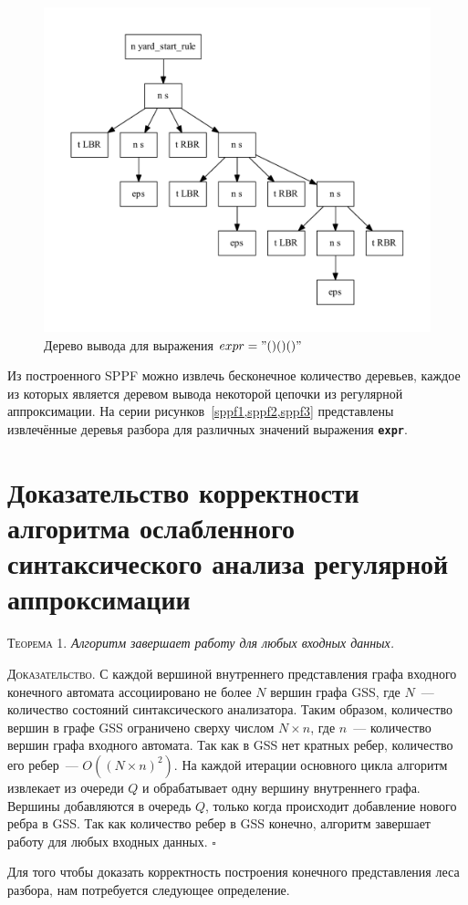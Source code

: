 \begin{figure}[!h]
 \centering
 \includegraphics[width=.7\textwidth]{pics/sppf3.pdf}
 \caption{Дерево вывода для выражения $expr="()()()"$}
 \label{sppf3}
\end{figure}

Из построенного SPPF можно извлечь бесконечное количество деревьев, каждое из которых является деревом вывода некоторой цепочки из регулярной аппроксимации. На серии рисунков~\ref{sppf1,sppf2,sppf3} представлены извлечённые деревья разбора для различных значений выражения \textbf{\texttt{expr}}.  


\chapter{Доказательство корректности алгоритма ослабленного синтаксического анализа регулярной аппроксимации}

\textsc{Теорема 1.} 
\textit{Алгоритм завершает работу для любых входных данных.}

\textsc{Доказательство.}
С каждой вершиной внутреннего представления графа входного конечного автомата ассоциировано не более $N$ вершин графа GSS, где $N$~--- количество состояний синтаксического анализатора. Таким образом, количество вершин в графе GSS ограничено сверху числом $N \times n$, где $n$~--- количество вершин графа входного автомата. Так как в GSS нет кратных ребер, количество его ребер~--- $O((N \times n)^{2})$. На каждой итерации основного цикла алгоритм извлекает из очереди $Q$ и обрабатывает одну вершину внутреннего графа. Вершины добавляются в очередь $Q$, только когда происходит добавление нового ребра в GSS. Так как количество ребер в GSS конечно, алгоритм завершает работу для любых входных данных. $\square$

Для того чтобы доказать корректность построения конечного представления леса разбора, нам потребуется следующее определение. 


